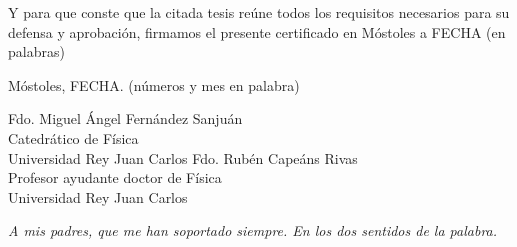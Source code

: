 \documentclass[a4paper,12pt]{newsiambook}
\newcommand{\clearemptydoublepage}{\newpage{\pagestyle{empty}\cleardoublepage}}
\newcommand{\dedica}{\sffamily \slshape}
\begin{document}
Y para que conste que la citada tesis reúne todos los requisitos necesarios para su defensa y aprobación, firmamos el presente certificado en Móstoles a FECHA (en palabras)

\vspace*{1cm}

\raggedleft
Móstoles, FECHA. (números y mes en palabra)

\centering


\vspace*{3.5cm}


\begin{multicols}{2}
Fdo. Miguel Ángel Fernández Sanjuán \\ Catedrático de Física \\ Universidad Rey Juan Carlos 
\columnbreak
Fdo. Rubén Capeáns Rivas \\ Profesor ayudante doctor de Física \\ Universidad Rey Juan Carlos
\end{multicols}



\justifying

\clearemptydoublepage

\thispagestyle{empty}

\begin{flushright}

\begin{minipage}[t][5cm][b]{0,5\textwidth}

{\dedica \large A mis padres, que me han soportado siempre. En los dos sentidos de la palabra.}

\end{minipage}
\end{flushright}

\clearemptydoublepage



 


\clearemptydoublepage



\setcounter{chapter}{0}





\clearemptydoublepage

\tableofcontents \clearemptydoublepage

\end{document}
